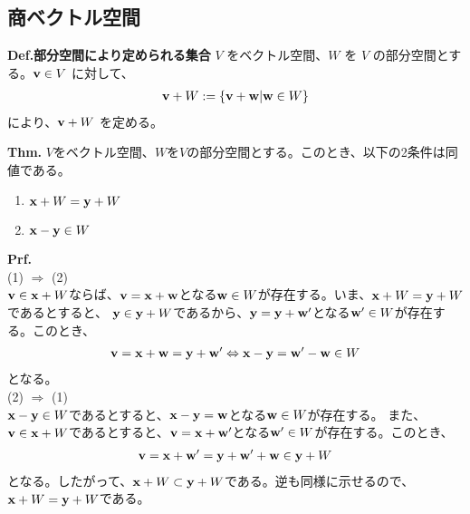 \documentclass[a4paper,11pt]{jsarticle}
\numberwithin{equation}{section}
\begin{document}
\subsection{商ベクトル空間}
\begin{itembox}[l]{\textbf{Def.部分空間により定められる集合}}
  $V$ をベクトル空間、$W$ を $V$ の部分空間とする。$\vb{v} \in V$ に対して、
  \begin{align}
      \vb{v} + W := \{\vb{v} + \vb{w} | \vb{w} \in W\}
  \end{align}
  により、$\vb{v} + W$ を定める。
\end{itembox}

\begin{itembox}[l]{\textbf{Thm.}}
  $V$をベクトル空間、$W$を$V$の部分空間とする。このとき、以下の2条件は同値である。
  \begin{enumerate}
      \item $\vb{x} + W = \vb{y} + W$
      \item $\vb{x} - \vb{y} \in W$
  \end{enumerate}
\end{itembox}
\textbf{Prf.}\\
(1) $\Rightarrow$ (2)\\
$\vb{v} \in \vb{x} + W$ならば、$\vb{v} = \vb{x} + \vb{w}$となる$\vb{w} \in W$が存在する。いま、$\vb{x} + W = \vb{y} + W$であるとすると、
$\vb{y} \in \vb{y} + W$であるから、$\vb{y} = \vb{y} + \vb{w'}$となる$\vb{w'} \in W$が存在する。このとき、
\begin{align}
  \vb{v} = \vb{x} + \vb{w} = \vb{y} + \vb{w'} \Leftrightarrow \vb{x} - \vb{y} = \vb{w'} - \vb{w} \in W
\end{align}
となる。\\
(2) $\Rightarrow$ (1)\\
$\vb{x} - \vb{y} \in W$であるとすると、$\vb{x} - \vb{y} = \vb{w}$となる$\vb{w} \in W$が存在する。
また、$\vb{v} \in \vb{x} + W$であるとすると、$\vb{v} = \vb{x} + \vb{w'}$となる$\vb{w'} \in W$が存在する。このとき、
\begin{align}
  \vb{v} = \vb{x} + \vb{w'} = \vb{y} + \vb{w'} + \vb{w} \in \vb{y} + W
\end{align}
となる。したがって、$\vb{x} + W \subset \vb{y} + W$である。逆も同様に示せるので、$\vb{x} + W = \vb{y} + W$である。\hfill\qedsymbol\\
\end{document}
